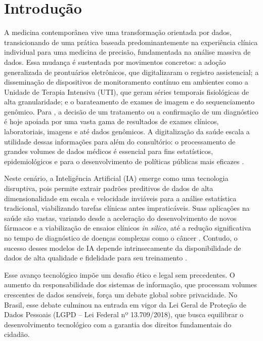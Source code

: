 \chapter{Introdução}
\label{ch:introducao}

A medicina contemporânea vive uma transformação orientada por dados, transicionando de uma prática baseada predominantemente na experiência clínica individual para uma medicina de precisão, fundamentada na análise massiva de dados. Essa mudança é sustentada por movimentos concretos: a adoção generalizada de prontuários eletrônicos, que digitalizaram o registro assistencial; a disseminação de dispositivos de monitoramento contínuo em ambientes como a Unidade de Terapia Intensiva (UTI), que geram séries temporais fisiológicas de alta granularidade; e o barateamento de exames de imagem e do sequenciamento genômico. Para , a decisão de um tratamento ou a confirmação de um diagnóstico é hoje apoiada por uma vasta gama de resultados de exames clínicos, laboratoriais, imagens e até dados genômicos. A digitalização da saúde escala a utilidade dessas informações para além do consultório: o processamento de grandes volumes de dados médicos é essencial para fins estatísticos, epidemiológicos e para o desenvolvimento de políticas públicas mais eficazes \cite{Goncalves2024}.

Neste cenário, a Inteligência Artificial (IA) emerge como uma tecnologia disruptiva, pois permite extrair padrões preditivos de dados de alta dimensionalidade em escala e velocidade inviáveis para a análise estatística tradicional, viabilizando tarefas clínicas antes impraticáveis. Suas aplicações na saúde são vastas, variando desde a aceleração do desenvolvimento de novos fármacos e a viabilização de ensaios clínicos \textit{in silico}, até a redução significativa no tempo de diagnóstico de doenças complexas como o câncer \cite{Junior2024}. Contudo, o sucesso desses modelos de IA depende intrinsecamente da disponibilidade de dados de alta qualidade e fidelidade para seu treinamento \cite{Shickel2018}.

Esse avanço tecnológico impõe um desafio ético e legal sem precedentes. O aumento da responsabilidade dos sistemas de informação, que processam volumes crescentes de dados sensíveis, força um debate global sobre privacidade. No Brasil, esse debate culminou na entrada em vigor da Lei Geral de Proteção de Dados Pessoais (LGPD – Lei Federal nº 13.709/2018), que busca equilibrar o desenvolvimento tecnológico com a garantia dos direitos fundamentais do cidadão.

